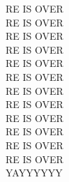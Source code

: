 \documentclass{article}
\begin{document}
\Huge{RE IS OVER\\
  RE IS OVER\\
  RE IS OVER\\
  RE IS OVER\\
  RE IS OVER\\
  RE IS OVER\\
  RE IS OVER\\
  RE IS OVER\\
  RE IS OVER\\
  RE IS OVER\\
  RE IS OVER\\
  RE IS OVER\\
  YAYYYYYY
}
\end{document}

